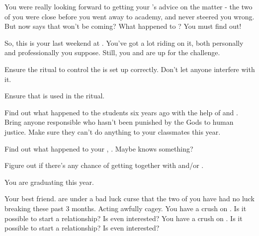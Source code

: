 \documentclass[char]{GL2020}
\begin{document}
You were really looking forward to getting your \cHeadDiplomat{\auncle}'s advice on the matter - the two of you were close before you went away to academy, and \cHeadDiplomat{\they} never steered you wrong. But now \cEbbPriest{} says that \cHeadDiplomat{} won't be coming? What happened to \cHeadDiplomat{\them}? You must find out!

So, this is your last weekend at \pSchool{}. You've got a lot riding on it, both personally and professionally you suppose. Still, you and \cInitiate{} are up for the challenge.


\begin{itemz}[Goals]
	\item  Ensure the ritual to control the is set up correctly. Don't let anyone interfere with it.
	\item Ensure that \iNet{} is used in the ritual.
	\item Find out what happened to the students six years ago with the help of \cHeir{} and \cLibAssist{}. Bring anyone responsible who hasn't been punished  by the Gods to human justice. Make sure they can't do anything to your classmates this year.
	\item Find out what happened to your \cHeadDiplomat{\auncle}, \cHeadDiplomat{}. Maybe \cEbbPriest{} knows something?
	\item Figure out if there's any chance of getting together with \cHeir{} and/or \cChupStudent{}.
\end{itemz}

\begin{itemz}[Notes]
	\item You are graduating this year.
\end{itemz}

\begin{contacts}
	\contact{\cInitiate{}} Your best friend. \cInitiate{\They} are under a bad luck curse that the two of you have had no luck breaking these past 3 months.
	\contact{\cLibrarian{}} Acting awfully cagey.
	\contact{\cHeir{}} You have a crush on \cHeir{\them}. Is it possible to start a relationship? Is \cHeir{} even interested?
	\contact{\cChupStudent{}} You have a crush on \cChupStudent{\them}. Is it possible to start a relationship? Is \cChupStudent{} even interested?
\end{contacts}
\end{document}
